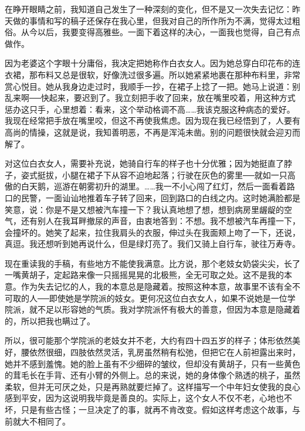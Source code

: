 在睁开眼睛之前，我知道自己发生了一种深刻的变化，但不是又一次失去记忆：昨天做的事情和写的稿子还保存在我心里，但我对自己的所作所为不满，觉得太过粗俗。从今以后，我要变得高雅些。一面下着这样的决心，一面我也觉得，自己有点做作。 

因为老婆这个字眼十分庸俗，我决定把她称作白衣女人。因为她总穿白印花布的连衣裙，那布料又总是很软，好像洗过很多遍。所以她紧紧地裹在那种布料里，非常赏心悦目。她从我身边走过时，我顺手一抄，在裙子上捻了一把。她马上说道：别乱来啊──快起来，要迟到了。我立刻把手收了回来，放在嘴里咬着，用这种方式惩办这只手，心里想着：看来，这个举动格调不高……我该克服这种病态的爱好。我现在经常把手放在嘴里咬，但这不再使我焦虑。因为现在我已经悟到了，人要有高尚的情操，这就是说，我知善明恶，不再是浑沌未凿。别的问题很快就会迎刃而解了。 

对这位白衣女人，需要补充说，她骑自行车的样子也十分优雅；因为她挺直了脖子，姿式挺拔，小腿在裙子下从容不迫地起落；行驶在灰色的雾里──就如一只高傲的白天鹅，巡游在朝雾初升的湖里。……我一不小心闯了红灯，然后一面看着路口的民警，一面讪讪地推着车子转了回来，回到路口的白线之内。这时她满脸都是笑意，说：你是不是又想被汽车撞一下？我认真地想了想，想到病房里龌龊的空气，还有别人在我耳畔撤尿的声音，由衷地答到：不想。我不想被汽车再撞一下，会撞坏的。她笑了起来，拉住我肩头的衣服，伸过头在我面颊上吻了一下，还说，真逗。我还想听到她再说什么，但是绿灯亮了。我们又骑上自行车，驶往万寿寺。 

现在重读我的手稿，有些地方不能使我满意。比方说，那个老妓女奶袋尖尖，长了一嘴黄胡子，定起路来像一只摇摇晃晃的北极熊，全无可取之处。这不是我的本意。作为失去记忆的人，我的本意总是隐藏着。按照这种本意，故事里不该有全不可取的人──即使她是学院派的妓女。更何况这位白衣女人，如果不说她是一位学院派，就不足以形容她的气质。我对学院派怀有极大的善意，但因为本意是隐藏着的，所以把我也瞒过了。 

所以，很可能那个学院派的老妓女并不老，大约有四十四五岁的样子；体形依然美好，腰依然很细，四肢依然灵活，乳房虽然稍有松弛，但把它在人前袒露出来时，她并不感到羞愧。她的脸上虽有不少细碎的皱纹，但却没有黄胡子，只有一些黄色的茸毛长在手背、还有小臂的外侧上。总的来说，她的身体像个熟透的桃子，虽然柔软，但并无可厌之处，只是再熟就要烂掉了。这样描写一个中年妇女使我的良心感到平安，因为这说明我毕竟是善良的。实际上，这个女人不仅不老，心地也不坏，只是有些古怪；一旦决定了的事，就再不肯改变。假如这样考虑这个故事，与前就大不相同了。 

